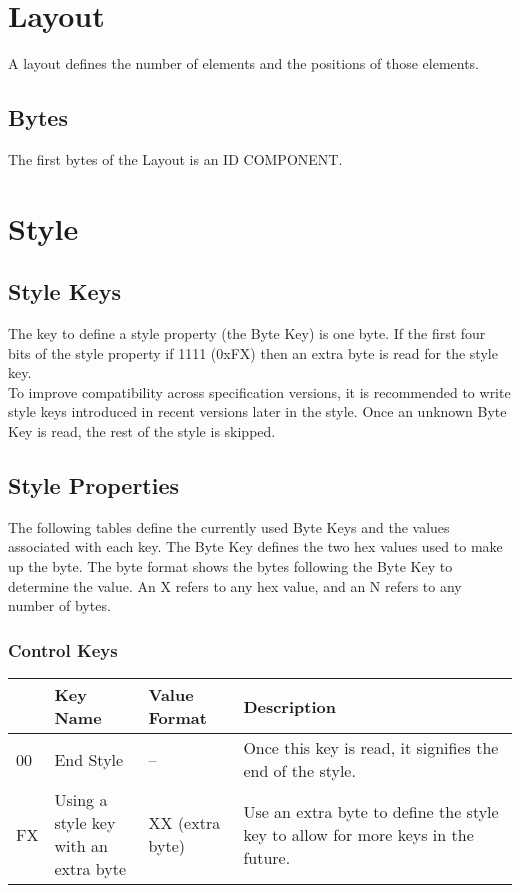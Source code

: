 \documentclass{report}
\begin{document}
\section{Layout}
A layout defines the number of elements and the positions of those elements. 
\subsection{Bytes}
The first bytes of the Layout is an ID COMPONENT. 
\section{Style}

\subsection{Style Keys}
The key to define a style property (the Byte Key) is one byte. If the first four bits of the style property if 1111 (0xFX) then an extra byte is read for the style key. \\
To improve compatibility across specification versions, it is recommended to write style keys introduced in recent versions later in the style. Once an unknown Byte Key is read, the rest of the style is skipped.
\subsection{Style Properties}
The following tables define the currently used Byte Keys and the values associated with each key. The Byte Key defines the two hex values used to make up the byte. The byte format shows the bytes following the Byte Key to determine the value. An X refers to any hex value, and an N refers to any number of bytes.
\subsubsection{Control Keys}
\begin{tabularx}{\textwidth}{l|l|l|X}
  \textbf{\makecell[cl]{Byte\\Key}} & \textbf{Key Name} & \textbf{Value Format} & \textbf{Description}\\
\hline
00 & End Style & -- & Once this key is read, it signifies the end of the style.\\
FX & \makecell[tl]{Using a style key\\with an extra byte} & XX (extra byte) & Use an extra byte to define the style key to allow for more keys in the future.\\
\end{tabularx}
\end{document}
